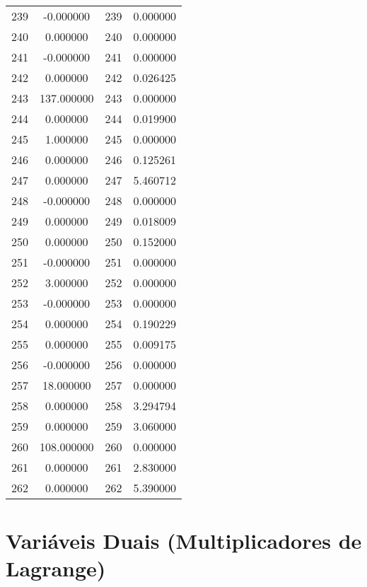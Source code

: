 \documentclass[12pt]{article}
\begin{document}
\begin{longtable}{@{}cccc@{}}
239 & -0.000000 & 239 & 0.000000 \\
240 & 0.000000 & 240 & 0.000000 \\
241 & -0.000000 & 241 & 0.000000 \\
242 & 0.000000 & 242 & 0.026425 \\
243 & 137.000000 & 243 & 0.000000 \\
244 & 0.000000 & 244 & 0.019900 \\
245 & 1.000000 & 245 & 0.000000 \\
246 & 0.000000 & 246 & 0.125261 \\
247 & 0.000000 & 247 & 5.460712 \\
248 & -0.000000 & 248 & 0.000000 \\
249 & 0.000000 & 249 & 0.018009 \\
250 & 0.000000 & 250 & 0.152000 \\
251 & -0.000000 & 251 & 0.000000 \\
252 & 3.000000 & 252 & 0.000000 \\
253 & -0.000000 & 253 & 0.000000 \\
254 & 0.000000 & 254 & 0.190229 \\
255 & 0.000000 & 255 & 0.009175 \\
256 & -0.000000 & 256 & 0.000000 \\
257 & 18.000000 & 257 & 0.000000 \\
258 & 0.000000 & 258 & 3.294794 \\
259 & 0.000000 & 259 & 3.060000 \\
260 & 108.000000 & 260 & 0.000000 \\
261 & 0.000000 & 261 & 2.830000 \\
262 & 0.000000 & 262 & 5.390000 \\

\end{longtable}

\section{Variáveis Duais (Multiplicadores de Lagrange)}
\end{document}

